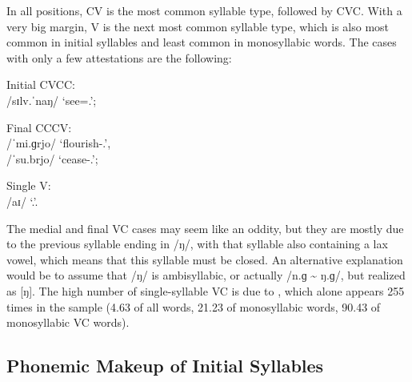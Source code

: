 In all positions, CV is the most common syllable type, followed by CVC. With a 
very big margin, V is the next most common syllable type, which is also most 
common in initial syllables and least common in monosyllabic words. The cases 
with only a few attestations are the following:

\pex
	\a Initial CVCC:\\
		 /sɪlv.ˈnaŋ/ `see=\Fpl{}.\Aarg{}';
		
	\a Final CCCV:\\
		 /ˈmi.ɡrjo/ `flourish-\Tsg{}.\N{}',\\
		 /ˈsu.brjo/ `cease-\Tsg{}.\N{}';
	
	\a Single V:\\
		 /aɪ/ `\Fsg{}.\Top{}'.
\xe

The medial and final VC cases may seem like an oddity, but they are mostly due 
to the previous syllable ending in /ŋ/, with that syllable also containing a 
lax vowel, which means that this syllable must be closed. An alternative 
explanation would be to assume that /ŋ/ is ambisyllabic, or actually /n.ɡ 
\textasciitilde{} ŋ.ɡ/, but realized as [ŋ]. The high number of single-syllable 
VC is due to , which alone appears 255 times in the 
sample (4.63\pct{} of all words, 21.23\pct{} of monosyllabic words, 90.43\pct{} 
of monosyllabic VC words).

\subsection{Phonemic Makeup of Initial Syllables}

